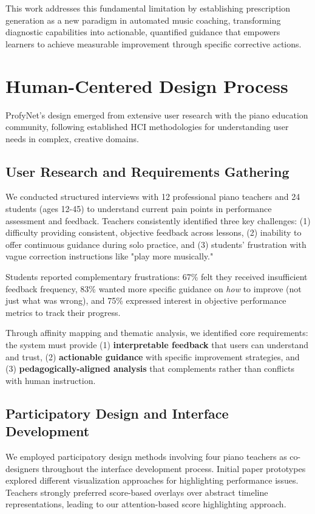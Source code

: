 \documentclass[sigconf,review,anonymous]{acmart}
\begin{document}
This work addresses this fundamental limitation by establishing prescription generation as a new paradigm in automated music coaching, transforming diagnostic capabilities into actionable, quantified guidance that empowers learners to achieve measurable improvement through specific corrective actions.

\section{Human-Centered Design Process}

ProfyNet's design emerged from extensive user research with the piano education community, following established HCI methodologies for understanding user needs in complex, creative domains.

\subsection{User Research and Requirements Gathering}

We conducted structured interviews with 12 professional piano teachers and 24 students (ages 12-45) to understand current pain points in performance assessment and feedback. Teachers consistently identified three key challenges: (1) difficulty providing consistent, objective feedback across lessons, (2) inability to offer continuous guidance during solo practice, and (3) students' frustration with vague correction instructions like "play more musically."

Students reported complementary frustrations: 67\% felt they received insufficient feedback frequency, 83\% wanted more specific guidance on \emph{how} to improve (not just what was wrong), and 75\% expressed interest in objective performance metrics to track their progress.

Through affinity mapping and thematic analysis, we identified core requirements: the system must provide (1) \textbf{interpretable feedback} that users can understand and trust, (2) \textbf{actionable guidance} with specific improvement strategies, and (3) \textbf{pedagogically-aligned analysis} that complements rather than conflicts with human instruction.

\subsection{Participatory Design and Interface Development}

We employed participatory design methods involving four piano teachers as co-designers throughout the interface development process. Initial paper prototypes explored different visualization approaches for highlighting performance issues. Teachers strongly preferred score-based overlays over abstract timeline representations, leading to our attention-based score highlighting approach.
\end{document}
